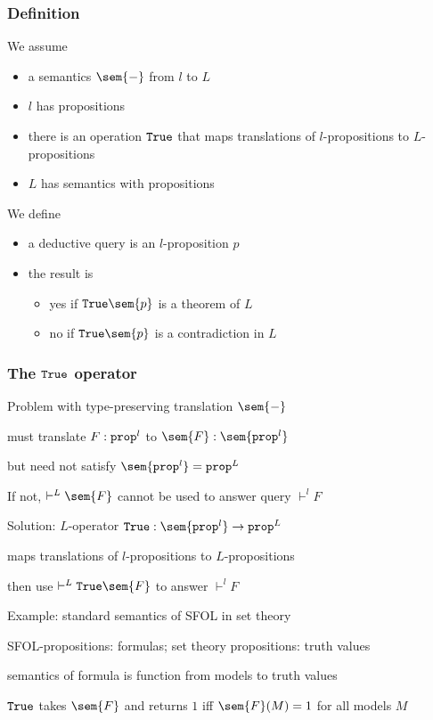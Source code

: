 \begin{frame}\frametitle{Definition}
We assume
\begin{itemize}
\item a semantics $\sem{-}$ from $l$ to $L$
\item $l$ has propositions
\item there is an operation $\truelift$ that maps translations of $l$-propositions to $L$-propositions
\item $L$ has semantics with propositions
\end{itemize}

We define
\begin{itemize}
\item a deductive query is an $l$-proposition $p$
\item the result is
 \begin{itemize}
 \item yes if $\truelift \sem{p}$ is a theorem of $L$
 \item no if $\truelift \sem{p}$ is a contradiction in $L$
 \end{itemize}
\end{itemize}
\end{frame}

\begin{frame}\frametitle{The $\truelift$ operator}
\begin{blockitems}{Problem with type-preserving translation $\sem{-}$}
\item must translate $F:\prop^l$ to $\sem{F}:\sem{\prop^l}$
\item but need not satisfy $\sem{\prop^l}=\prop^L$ \\
\item If not, $\vdash^L \sem{F}$ cannot be used to answer query $\vdash^l F$
\end{blockitems}

\begin{blockitems}{Solution: $L$-operator $\truelift: \sem{\prop^l}\to \prop^L$}
\item maps translations of $l$-propositions to $L$-propositions
\item then use $\vdash^L \truelift \sem{F}$ to answer $\vdash^l F$
\end{blockitems}

\begin{blockitems}{Example: standard semantics of SFOL in set theory}
\item SFOL-propositions: formulas; set theory propositions: truth values
\item semantics of formula is function from models to truth values
\item $\truelift$ takes $\sem{F}$ and returns $1$ iff $\sem{F}(M)=1$ for all models $M$
\end{blockitems}
\end{frame}
  

